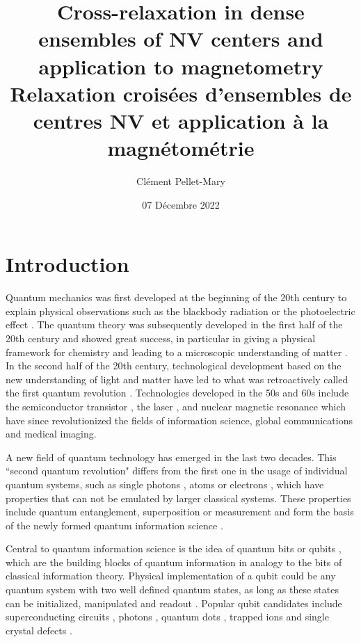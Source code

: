 \documentclass[a4paper, 11pt]{report}
\title{Cross-relaxation in dense ensembles of NV centers and application to magnetometry \\ \medskip Relaxation croisées d'ensembles de centres NV et application à la magnétométrie}
\author{Clément Pellet-Mary}
\institute{ENS Paris}
\date{07 Décembre 2022}
\begin{document}
\maketitle{}
\setcounter{tocdepth}{1}

\tableofcontents
 
\chapter*{Introduction}

Quantum mechanics was first developed at the beginning of the 20th century to explain physical observations such as the blackbody radiation \citep{planck1900theorie} or the photoelectric effect \citep{einstein1905erzeugung}. The quantum theory was subsequently developed in the first half of the 20th century and showed great success, in particular in giving a physical framework for chemistry \citep{pauling1931nature} and leading to a microscopic understanding of matter \citep{kittel1996introduction}. In the second half of the 20th century, technological development based on the new understanding of light and matter have led to what was retroactively called the first quantum revolution \citep{thew2019focus}. Technologies developed in the 50s and 60s include the semiconductor transistor \citep{bardeen1948transistor}, the laser \citep{maiman1960stimulated}, and nuclear magnetic resonance \citep{abragam1961principles} which have since revolutionized the fields of information science, global communications and medical imaging. 

A new field of quantum technology has emerged in the last two decades. This ``second quantum revolution" differs from the first one in the usage of individual quantum systems, such as single photons \citep{gleyzes2007quantum}, atoms \citep{neuhauser1980localized} or electrons \citep{peil1999observing}, which have properties that can not be emulated by larger classical systems. These properties include quantum entanglement, superposition or measurement and form the basis of the newly formed quantum information science \citep{nielsen2002quantum, vedral2006introduction, hayashi2006quantum}. 

Central to quantum information science is the idea of quantum bits or qubits \citep{schumacher1996sending}, which are the building blocks of quantum information in analogy to the bits of classical information theory. Physical implementation of a qubit could be any quantum system with two well defined quantum states, as long as these states can be initialized, manipulated and readout \citep{divincenzo2000physical}. Popular qubit candidates include superconducting circuits \citep{nakamura1999coherent, orlando1999superconducting}, photons \citep{bennett1992quantum, zhong2020quantum}, quantum dots \citep{veldhorst2014addressable, zajac2018resonantly}, trapped ions \citep{friis2018observation, wright2019benchmarking} and single crystal defects \citep{jelezko2006single, baranov2011silicon, zhong2015optically}.
\end{document}
